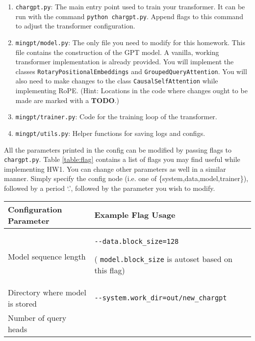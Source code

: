 \documentclass[11pt,addpoints,answers]{exam}
\begin{document}
\begin{questions}
\begin{enumerate}
    \item \lstinline{chargpt.py}: The main entry point used to train your transformer. It can be run with the command \lstinline{python chargpt.py}. Append flags to this command to adjust the transformer configuration.
    
    \item \lstinline{mingpt/model.py}: The only file you need to modify for this homework. This file contains the construction of the GPT model. A vanilla, working transformer implementation is already provided. You will implement the classes \lstinline{RotaryPositionalEmbeddings} and \lstinline{GroupedQueryAttention}. You will also need to make changes to the class \lstinline{CausalSelfAttention} while implementing RoPE. (Hint: Locations in the code where changes ought to be made are marked with a \textbf{TODO}.)

    \item \lstinline{mingpt/trainer.py}: Code for the training loop of the transformer.
    
    \item \lstinline{mingpt/utils.py}: Helper functions for saving logs and configs.
    
\end{enumerate}


All the parameters printed in the config can be modified by passing flags to \lstinline{chargpt.py}. Table \ref{table:flag} contains a list of flags you may find useful while implementing HW1. You can change other parameters as well in a similar manner. Simply specify the config node (i.e. one of \{system,data,model,trainer\}), followed by a period `.', followed by the parameter you wish to modify.

\begin{table}[h!]
\centering
\begin{tabular}{|p{0.35\linewidth}|p{0.65\linewidth}|}
\hline
Configuration Parameter & Example Flag Usage \\ \hline
Model sequence length &  \lstinline|--data.block_size=128|

( \lstinline|model.block_size| is autoset based on this flag) \\ \hline
Directory where model is stored &  \lstinline|--system.work_dir=out/new_chargpt| \\ \hline
Number of query heads 


\end{tabular}
\end{table}
\end{questions}
\end{document}
